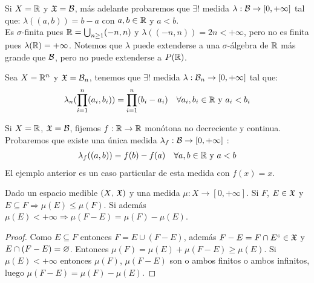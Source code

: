 \begin{eg}
    Si $X = \mathbb{R}$ y $\mathfrak{X} = \mathcal{B}$, más adelante probaremos que $\exists !$ medida $\lambda : \mathcal{B} \to [0, +\infty]$ tal que:
    $\lambda((a, b)) = b-a$ con $a, b \in \mathbb{R}$ y $a < b$. \\
    Es $\sigma$-finita pues $\mathbb{R} = \bigcup_{n \geq 1} (-n, n)$ y $\lambda((-n, n)) = 2n < +\infty$, pero no es finita pues $\lambda(\mathbb{R}) = +\infty$.
    Notemos que $\lambda$ puede extenderse a una $\sigma$-álgebra de $\mathbb{R}$ más grande que $\mathcal{B}$, pero no puede extenderse a $P(\mathbb{R})$.
\end{eg}

\begin{eg}
    Sea $X = \mathbb{R}^n$ y $ \mathfrak{X} = \mathcal{B}_n$, tenemos que $\exists!$ medida $\lambda : \mathcal{B}_n \to [0, +\infty]$ tal que:
    \begin{align*}
        \lambda_n(\prod_{i = 1}^n (a_i, b_i)) = \prod_{i = 1}^n (b_i - a_i) \quad \forall a_i, b_i \in \mathbb{R} \text{ y } a_i < b_i
    \end{align*}
\end{eg}

\clearpage

\begin{eg}
    Si $X = \mathbb{R}$, $\mathfrak{X} = \mathcal{B}$, fijemos $f: \mathbb{R} \to \mathbb{R}$ monótona no decreciente y continua. Probaremos que existe una única medida $\lambda_f : \mathcal{B} \to [0, +\infty]$ :
    \begin{align*}
        \lambda_f((a, b)) = f(b) - f(a) \quad \forall a, b \in \mathbb{R} \text{ y } a < b
    \end{align*}
    El ejemplo anterior es un caso particular de esta medida con $f(x) = x$.
\end{eg}

\begin{lemma}
    Dado un espacio medible $(X\text{, } \mathfrak{X})$ y una medida $\mu : X \to [0, +\infty]$. Si $F$, $E \in \mathfrak{X}$ y $E \subseteq F \Rightarrow \mu(E) \leq \mu(F)$.
    Si además $\mu(E) < +\infty \Rightarrow \mu(F - E) = \mu(F) - \mu(E)$.
    \begin{proof}
        Como $E \subseteq F$ entonces $F = E \cup (F - E)$, además $F - E = F \cap E^c \in \mathfrak{X}$ y $E \cap (F - E) = \varnothing$.
        Entonces $\mu(F) = \mu(E) + \mu(F - E) \geq \mu(E)$.
        Si $\mu(E) < +\infty$ entonces $\mu(F)$, $\mu(F - E)$ son o ambos finitos o ambos infinitos, luego $\mu(F - E) = \mu(F) - \mu(E)$.
    \end{proof}
\end{lemma}

